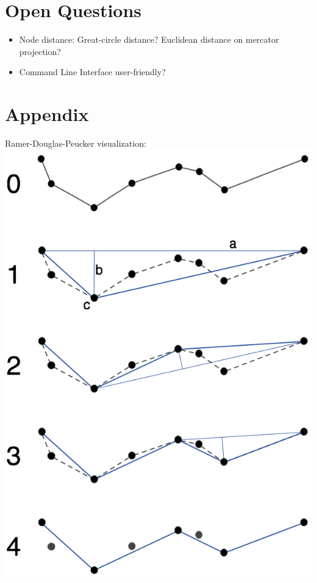 \documentclass[twoside]{scrartcl}
\begin{document}
\section{Open Questions}
\begin{itemize}
    \item Node distance: Great-circle distance? Euclidean distance on mercator projection?
    \item Command Line Interface user-friendly?
\end{itemize}

\newpage
\section{Appendix}
Ramer-Douglas-Peucker visualization:\\
\includegraphics[scale=0.6]{rdp.png}
\end{document}
